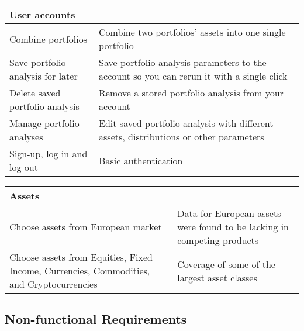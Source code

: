 \documentclass[main.tex]{subfiles}
\begin{document}
{
\setlength{\tabcolsep}{30pt}
\renewcommand{\arraystretch}{2}
\centering
{}
\begin{tabularx}{\linewidth}{|X|X|}
\hline
 \textbf{User accounts}  &  \\
 \hline
 Combine portfolios & Combine two portfolios' assets into one single portfolio \\
\hline
Save portfolio analysis for later & Save portfolio analysis parameters to the account so you can rerun it with a single click \\
\hline
Delete saved portfolio analysis & Remove a stored portfolio analysis from your account \\
\hline
Manage portfolio analyses & Edit saved portfolio analysis with different assets, distributions or other parameters \\
\hline
Sign-up, log in and log out & Basic authentication \\
\hline
\end{tabularx}
}

\vspace{0.5cm}

{
\setlength{\tabcolsep}{30pt}
\renewcommand{\arraystretch}{2}
\centering
{}
\begin{tabularx}{\linewidth}{|X|X|}
\hline
 \textbf{Assets}  &  \\
 \hline
 Choose assets from European market & Data for European assets were found to be lacking in competing products \\
\hline
Choose assets from Equities, Fixed Income, Currencies, Commodities, and Cryptocurrencies & Coverage of some of the largest asset classes \\
\hline
\end{tabularx}
}

\subsection{Non-functional Requirements}
\end{document}
